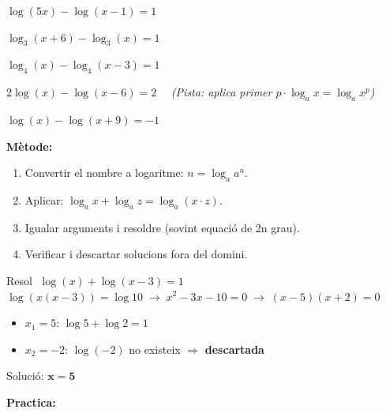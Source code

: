 \documentclass[12pt,a4paper]{article}
\begin{document}
\begin{exercicis}
    \item $\log(5x) - \log(x-1) = 1$
    \item $\log_3(x+6) - \log_3(x) = 1$
    \item $\log_4(x) - \log_4(x-3) = 1$
    \item $2\log(x) - \log(x-6) = 2 \quad$ \textit{(Pista: aplica primer $p\cdot\log_a x = \log_a x^p$)}
    \item $\log(x) - \log(x+9) = -1$
\end{exercicis}

\newpage





\begin{metodebox}
\textbf{Mètode:}
\begin{enumerate}[noitemsep, label=\arabic*.]
    \item Convertir el nombre a logaritme: $n = \log_a a^n$.
    \item Aplicar: $\log_a x + \log_a z = \log_a(x \cdot z)$.
    \item Igualar arguments i resoldre (sovint equació de 2n grau).
    \item Verificar i descartar solucions fora del domini.
\end{enumerate}
\end{metodebox}

\vspace{0.2cm}

\begin{tcolorbox}[exemplebox]
Resol $\;\log(x) + \log(x-3) = 1$
\tcblower
$\log(x(x-3)) = \log 10 \;\longrightarrow\; x^2-3x-10=0 \;\longrightarrow\; (x-5)(x+2)=0$
\begin{itemize}[noitemsep]
    \item $x_1=5$: $\log 5 + \log 2 = 1$ \checkmark
    \item $x_2=-2$: $\log(-2)$ no existeix $\Rightarrow$ \textbf{descartada}
\end{itemize}
Solució: $\boldsymbol{x=5}$
\end{tcolorbox}

\vspace{0.3cm}
\noindent\textbf{Practica:}
\end{document}
